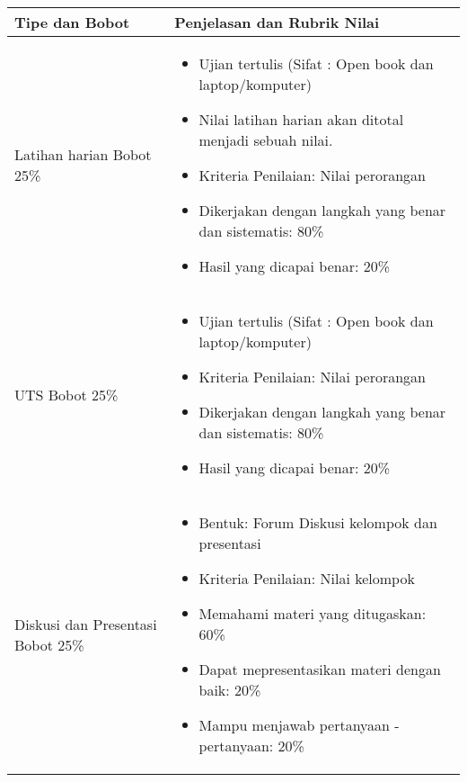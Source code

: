 \documentclass[11pt, a4paper]{article}
\newenvironment{myitemize}
{ \begin{itemize} [label={--},noitemsep,leftmargin=*,topsep=0pt,partopsep=0pt]  }
	{ \end{itemize}  }
\begin{document}
\begin{longtable}[]{p{4cm}P{12cm}}
	\toprule
	Tipe dan Bobot & Penjelasan dan Rubrik Nilai\\
	\midrule
	\endhead
	
	Latihan harian \break Bobot 25\% & 
	\begin{myitemize}
			\item
			Ujian tertulis (Sifat : Open book dan laptop/komputer)
			\item
			Nilai latihan harian akan ditotal menjadi sebuah nilai.
			\item
			Kriteria Penilaian: Nilai perorangan
		\end{myitemize}
		\begin{itemize}[label={$\bullet$},noitemsep,topsep=0pt,partopsep=0pt]
			\item
			Dikerjakan dengan langkah yang benar dan sistematis: 80\%
			\item
			Hasil yang dicapai benar: 20\%
		\end{itemize}
	\tabularnewline
		
	UTS \break Bobot 25\% &
	\begin{myitemize}
		\item
		Ujian tertulis (Sifat : Open book dan laptop/komputer)
		\item
		Kriteria Penilaian: Nilai perorangan
	\end{myitemize}	
	\begin{itemize}[label={$\bullet$},noitemsep,topsep=0pt,partopsep=0pt]
		\item
		Dikerjakan dengan langkah yang benar dan sistematis: 80\%
		\item
		Hasil yang dicapai benar: 20\%
	\end{itemize}\tabularnewline
	
	Diskusi dan Presentasi \break Bobot 25\% &
	\begin{myitemize}
		\item
		Bentuk: Forum Diskusi kelompok dan presentasi
		\item
		Kriteria Penilaian: Nilai kelompok
	\end{myitemize}	
	\begin{itemize}[label={$\bullet$},noitemsep,topsep=0pt,partopsep=0pt]
		\item
		Memahami materi yang ditugaskan: 60\%
		\item
		Dapat mepresentasikan materi dengan baik: 20\%
		\item
		Mampu menjawab pertanyaan - pertanyaan: 20\%
	\end{itemize}\tabularnewline
	

\end{longtable}
\end{document}
